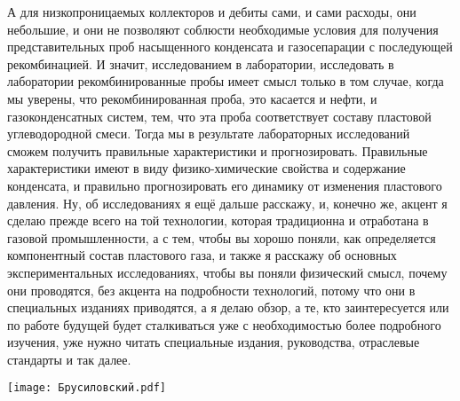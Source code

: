 \documentclass[main.tex]{subfiles}
\begin{document}
А для низкопроницаемых коллекторов и дебиты сами, и сами расходы, они небольшие, и они не позволяют соблюсти необходимые условия для получения представительных проб насыщенного конденсата и газосепарации с последующей рекомбинацией.
И значит, исследованием в лаборатории, исследовать в лаборатории рекомбинированные пробы имеет смысл только в том случае, когда мы уверены, что рекомбинированная проба, это касается и нефти, и газоконденсатных систем, тем, что эта проба соответствует составу пластовой углеводородной смеси.
Тогда мы в результате лабораторных исследований сможем получить правильные характеристики и прогнозировать.
Правильные характеристики имеют в виду физико-химические свойства и содержание конденсата, и правильно прогнозировать его динамику от изменения пластового давления.
Ну, об исследованиях я ещё дальше расскажу, и, конечно же, акцент я сделаю прежде всего на той технологии, которая традиционна и отработана в газовой промышленности, а с тем, чтобы вы хорошо поняли, как определяется компонентный состав пластового газа, и также я расскажу об основных экспериментальных исследованиях, чтобы вы поняли физический смысл, почему они проводятся, без акцента на подробности технологий, потому что они в специальных изданиях приводятся, а я делаю обзор, а те, кто заинтересуется или по работе будущей будет сталкиваться уже с необходимостью более подробного изучения, уже нужно читать специальные издания, руководства, отраслевые стандарты и так далее.

\begin{center}
\texttt{[image: Брусиловский.pdf]}
\end{center}
\end{document}
